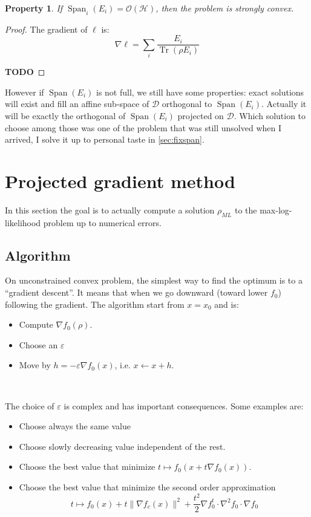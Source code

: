 \documentclass[10pt]{report}
\theoremstyle{plain}
\newtheorem{prop}[thm]{Property}
\theoremstyle{definition}
\theoremstyle{remark}
\newcommand{\TODO}{\textbf{TODO}}
\DeclareMathOperator{\Tr}{Tr}
\DeclareMathOperator{\Span}{Span}
\newcommand{\ml}{_{M\!L}}
\begin{document}
\begin{prop}
  If $\Span_i(E_i) = \mathcal{O}(\mathcal{H})$, then the problem is strongly convex.
\end{prop}

\begin{proof}
The gradient of $\ell$ is:
\begin{equation}
\nabla \ell = \sum_i \frac{E_i}{\Tr(\rho E_i)}
\end{equation}

  \TODO{}
\end{proof}

However if $\Span(E_i)$ is not full, we still have some properties: exact
solutions will exist and fill an affine sub-space of $\mathcal{D}$ orthogonal to
$\Span(E_i)$. Actually it will be exactly the orthogonal of $\Span(E_i)$
projected on $\mathcal{D}$. Which solution to choose among those was one of the problem that
was still unsolved when I arrived, I solve it up to personal taste in \cref{sec:fixspan}.








\section{Projected gradient method}

In this section the goal is to actually compute a solution $\rho\ml$ to the
max-log-likelihood problem up to
numerical errors.

\subsection{Algorithm}

On unconstrained convex problem, the simplest way to find the optimum is to a
``gradient descent''. It means that when we go downward (toward lower $f_0$)
following the gradient. The algorithm start from $x = x_0$ and is:

\begin{itemize}
\item Compute $\nabla f_0(\rho)$.
\item Choose an $\varepsilon$
\item Move by $h = -\varepsilon \nabla f_0(x)$, i.e. $x \leftarrow x + h$.
\end{itemize}

\

\noindent The choice of $\varepsilon$ is complex and has important consequences.
Some examples are:
\begin{itemize}
\item Choose always the same value
\item Choose slowly decreasing value independent of the rest.
\item Choose the best value that minimize $t \mapsto f_0(x + t\nabla f_0(x))$.
\item Choose the best value that minimize the second order approximation
  \[t \mapsto f_0(x) + t\|\nabla f_c(x)\|^2 + \frac {t^2} 2 \nabla f_0^t \cdot
  \nabla^2\!f_0 \cdot \nabla f_0\]
\end{itemize}
\end{document}
